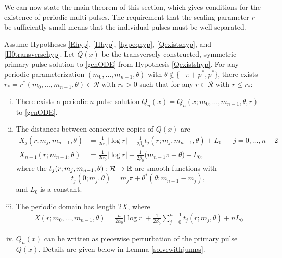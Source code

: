 \documentclass[thesis.tex]{subfiles}
\begin{document}
We can now state the main theorem of this section, which gives conditions for the existence of periodic multi-pulses. The requirement that the scaling parameter $r$ be sufficiently small means that the individual pulses must be well-separated. 

\begin{theorem}\label{perexist}
Assume Hypotheses \ref{Ehyp}, \ref{Hhyp}, \ref{hypeqhyp}, \ref{Qexistshyp}, and \ref{H0transversehyp}. Let $Q(x)$ be the transversely constructed, symmetric primary pulse solution to \eqref{genODE} from Hypothesis \ref{Qexistshyp}. For any periodic parameterization $(m_0, \dots, m_{n-1}, \theta)$ with $\theta \notin \{-\pi + p^*, p^* \}$, there exists $r_* = r^*(m_0, \dots, m_{n-1}, \theta) \in \mathcal{R}$ with $r_* > 0$ such that for any $r \in \mathcal{R}$ with $r \leq r_*$:
\begin{enumerate}[(i)]
	\item There exists a periodic $n$-pulse solution $Q_n(x) = Q_n(x; m_0, \dots, m_{n-1}, \theta, r)$ to \eqref{genODE}.

	\item The distances between consecutive copies of $Q(x)$ are
	\begin{align}\label{Xj}
		X_j(r; m_j, m_{n-1},\theta) &= \frac{1}{2 \alpha_0} |\log r| + \frac{1}{2\beta_0} t_j(r; m_j,m_{n-1}, \theta) + L_0 && j = 0, \dots, n-2 \\
		X_{n-1}(r; m_{n-1}, \theta) &= \frac{1}{2 \alpha_0} |\log r| + \frac{1}{2 \beta_0}\big( m_{n-1}\pi + \theta \big) + L_0,
	\end{align}
	where the $t_j(r; m_j, m_{n-1}, \theta): \mathcal{R} \rightarrow \mathbb{R}$ are smooth functions with 
	\[
	t_j(0; m_j, \theta) = m_j \pi + \theta^*(\theta; m_{n-1} - m_j),
	\]
	and $L_0$ is a constant.

	\item The periodic domain has length $2X$, where
	\begin{align}\label{Xdomain}
	X(r; m_0, \dots, m_{n-1}, \theta) = \frac{n}{2\alpha_0} |\log r| + \frac{1}{2\beta_0} \sum_{j=0}^{n-1} t_j(r; m_j, \theta) + n L_0
	\end{align}

	\item $Q_n(x)$ can be written as piecewise perturbation of the primary pulse $Q(x)$. Details are given below in Lemma \ref{solvewithjumps}.
\end{enumerate}
\end{theorem}
\end{document}
